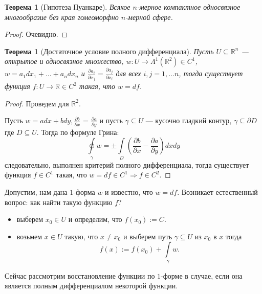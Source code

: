 \documentclass[a5paper]{article}
\newcounter{through}
\theoremstyle{plain}
\newtheorem{theorem}[through]{Теорема}
\theoremstyle{definition}
\numberwithin{through}{section}
\numberwithin{equation}{section}
\begin{document}
\begin{theorem}[Гипотеза Пуанкаре]
	Всякое $n$-мерное компактное односвязное многообразие без края гомеоморфно $n$-мерной сфере.
\end{theorem}

\begin{proof}
	Очевидно.
\end{proof}


\begin{theorem}[Достаточное условие полного дифференциала]
	
	Пусть $U \subseteq \mathbb{R}^n$ --- открытое и односвязное множество, 
	$w: U \to \Lambda^1(\mathbb{R}^2) \in C^1$, $w = a_1 dx_1 + \ldots + a_n dx_n $ 
	и $\frac{\partial a_i}{\partial x_j} = \frac{\partial a_j}{\partial x_i}$
	для всех $i, j = 1, \ldots n$, тогда существует функция $f: U \to \mathbb{R} \in C^2$ 
	такая, что $w = df$.
	
\end{theorem}

\begin{proof}
	Проведем для $\mathbb{R}^2$.
	
	Пусть $w = adx + bdy, \frac{\partial b}{\partial x}$ = $\frac{\partial a}{\partial y}$ и
	пусть $\gamma \subseteq U$ --- кусочно гладкий контур, $\gamma \subseteq \partial D$
	где $D \subseteq U$. Тогда по формуле Грина:
	\[ \oint\limits_\gamma w = \pm \int\limits_D \left( \frac{\partial b}{\partial x} -
	\frac{\partial a}{\partial y} \right) dxdy \]
	следовательно, выполнен критерий полного дифференциала, тогда существует функция 
	$f \in C^1$ такая, что $w = df \in C^1 \Rightarrow f \in C^2$.
\end{proof}

Допустим, нам дана $1$-форма $w$ и известно, что $w = df$. Возникает естественный вопрос: 
как найти такую функцию $f$?
\begin{itemize}
	\item
	выберем $x_0 \in U$ и определим, что $f(x_0) := C$.
	
	\item
	возьмем $x \in U$ такую, что $x \ne x_0$ и выберем путь $\gamma \subseteq U$ из $ x_0 $ в $x$
	тогда \[ f(x) := f(x_0) + \int\limits_\gamma w. \]
\end{itemize}

Сейчас рассмотрим восстановление функции по $1$-форме в случае, если она является полным дифференциалом некоторой функции.
\end{document}

